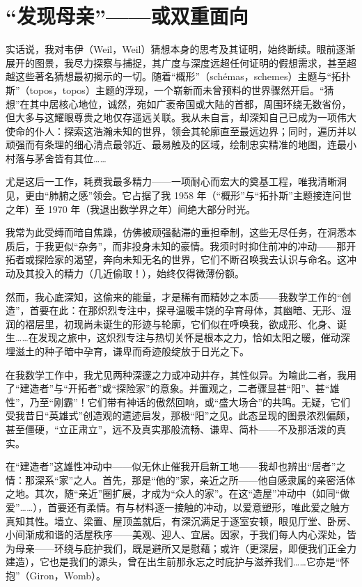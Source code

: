 \section{“发现母亲”——或双重面向}

实话说，我对韦伊（Weil，Weil）猜想本身的思考及其证明，始终断续。眼前逐渐展开的图景，我尽力探察与捕捉，其广度与深度远超任何证明的假想需求，甚至超越这些著名猜想最初揭示的一切。随着“概形”（schémas，schemes）主题与“拓扑斯”（topos，topos）主题的浮现，一个崭新而未曾预料的世界骤然开启。“猜想”在其中居核心地位，诚然，宛如广袤帝国或大陆的首都，周围环绕无数省份，但大多与这耀眼尊贵之地仅存遥远关联。我从未自言，却深知自己已成为一项伟大使命的仆人：探索这浩瀚未知的世界，领会其轮廓直至最远边界；同时，遍历并以顽强而有条理的细心清点最邻近、最易触及的区域，绘制忠实精准的地图，连最小村落与茅舍皆有其位……

尤是这后一工作，耗费我最多精力——一项耐心而宏大的奠基工程，唯我清晰洞见，更由“肺腑之感”领会。它占据了我 1958 年（“概形”与“拓扑斯”主题接连问世之年）至 1970 年（我退出数学界之年）间绝大部分时光。

我常为此受缚而暗自焦躁，仿佛被顽强黏滞的重担牵制，这些无尽任务，在洞悉本质后，于我更似“杂务”，而非投身未知的豪情。我须时时抑住前冲的冲动——那开拓者或探险家的渴望，奔向未知无名的世界，它们不断召唤我去认识与命名。这冲动及其投入的精力（几近偷取！），始终仅得微薄份额。

然而，我心底深知，这偷来的能量，才是稀有而精妙之本质——我数学工作的“创造”，首要在此：在那炽烈专注中，探寻温暖丰饶的孕育母体，其幽暗、无形、湿润的褶层里，初现尚未诞生的形迹与轮廓，它们似在呼唤我，欲成形、化身、诞生……在发现之旅中，这炽烈专注与热切关怀是根本之力，恰如太阳之暖，催动深埋滋土的种子暗中孕育，谦卑而奇迹般绽放于日光之下。

在我数学工作中，我尤见两种深邃之力或冲动并存，其性似异。为喻此二者，我用了“建造者”与“开拓者”或“探险家”的意象。并置观之，二者骤显甚“阳”、甚“雄性”，乃至“刚霸”！它们带有神话的傲然回响，或“盛大场合”的共鸣。无疑，它们受我昔日“英雄式”创造观的遗迹启发，那极“阳”之见。此态呈现的图景浓烈偏颇，甚至僵硬，“立正肃立”，远不及真实那般流畅、谦卑、简朴——不及那活泼的真实。

在“建造者”这雄性冲动中——似无休止催我开启新工地——我却也辨出“居者”之情：那深系“家”之人。首先，那是“他的”家，亲近之所——他自感隶属的亲密活体之地。其次，随“亲近”圈扩展，才成为“众人的家”。在这“造屋”冲动中（如同“做爱”……），首要还有柔情。有与材料逐一接触的冲动，以爱意塑形，唯此爱之触方真知其性。墙立、梁置、屋顶盖就后，有深沉满足于逐室安顿，眼见厅堂、卧房、小间渐成和谐的活屋秩序——美观、迎人、宜居。因家，于我们每人内心深处，皆为母亲——环绕与庇护我们，既是避所又是慰藉；或许（更深层，即便我们正全力建造），它也是我们的源头，曾在出生前那永忘之时庇护与滋养我们……它亦是“怀抱”（Giron，Womb）。

